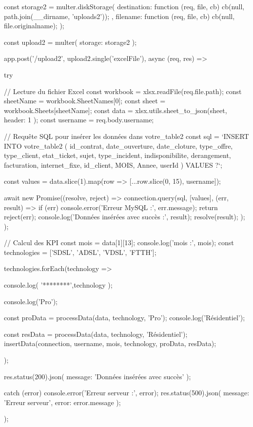   const storage2 = multer.diskStorage({
    destination: function (req, file, cb) { cb(null, path.join(__dirname, 'uploads2')); },
    filename: function (req, file, cb) { cb(null, file.originalname);  }
  });
  
  
  
  const upload2 = multer({ storage: storage2 });



app.post('/upload2', upload2.single('excelFile'), async (req, res) => {
  try {
      // Lecture du fichier Excel
      const workbook = xlsx.readFile(req.file.path);
      const sheetName = workbook.SheetNames[0];
      const sheet = workbook.Sheets[sheetName];
      const data = xlsx.utils.sheet_to_json(sheet, { header: 1 });
      const username = req.body.username;

      // Requête SQL pour insérer les données dans votre_table2
      const sql = `INSERT INTO votre_table2 (
          id_contrat, date_ouverture, date_cloture, type_offre, type_client, etat_ticket, 
          sujet, type_incident, indisponibilite, derangement, facturation, 
          internet_fixe, id_client, MOIS, Annee, userId	
      ) VALUES ?`;

      const values = data.slice(1).map(row => [...row.slice(0, 15), username]);

      await new Promise((resolve, reject) => {
          connection.query(sql, [values], (err, result) => {
              if (err) {
                  console.error('Erreur MySQL :', err.message);
                  return reject(err);
              }
              console.log('Données insérées avec succès :', result);
              resolve(result);
          });
      });

      // Calcul des KPI
      const mois = data[1][13];
      console.log('mois :', mois);
      const technologies = ['SDSL', 'ADSL', 'VDSL', 'FTTH'];

      technologies.forEach(technology => {
        console.log( '********',technology );

        console.log('Pro');

        const proData = processData(data, technology, 'Pro');
        console.log('Résidentiel');

        const resData = processData(data, technology, 'Résidentiel');
        insertData(connection, username, mois, technology, proData, resData);
      });

      res.status(200).json({ message: 'Données insérées avec succès' });

  } catch (error) {
      console.error('Erreur serveur :', error);
      res.status(500).json({ message: 'Erreur serveur', error: error.message });
  }
});
